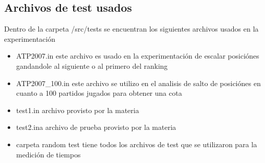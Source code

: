 \subsection{Archivos de test usados}
Dentro de la carpeta /src/tests se encuentran los siguientes archivos usados en la experimentaci\'on
\begin{itemize}
 \item ATP2007.in este archivo es usado en la experimentaci\'on de escalar posici\'ones gandandole al siguiente o al primero del ranking
 \item ATP2007_100.in este archivo se utilizo en el analisis de salto de posici\'ones en cuanto a 100 partidos jugados para obtener una cota
 \item test1.in archivo provisto por la materia
 \item test2.ina archivo de prueba provisto por la materia
 \item carpeta random test tiene todos los archivos de test que se utilizaron para la medici\'on de tiempos
\end{itemize}

